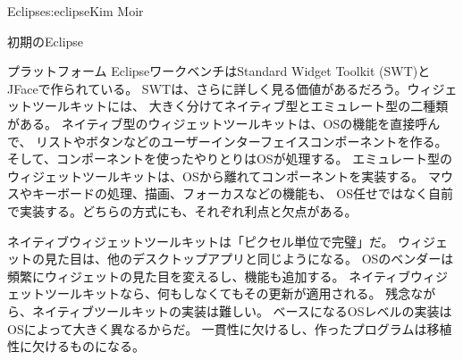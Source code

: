 \begin{aosachapter}{Eclipse}{s:eclipse}{Kim Moir}
\begin{aosasect1}{初期のEclipse}
\begin{aosasect2}{プラットフォーム}
EclipseワークベンチはStandard Widget Toolkit (SWT)とJFaceで作られている。
SWTは、さらに詳しく見る価値があるだろう。ウィジェットツールキットには、
大きく分けてネイティブ型とエミュレート型の二種類がある。
ネイティブ型のウィジェットツールキットは、OSの機能を直接呼んで、
リストやボタンなどのユーザーインターフェイスコンポーネントを作る。
そして、コンポーネントを使ったやりとりはOSが処理する。
エミュレート型のウィジェットツールキットは、OSから離れてコンポーネントを実装する。
マウスやキーボードの処理、描画、フォーカスなどの機能も、
OS任せではなく自前で実装する。どちらの方式にも、それぞれ利点と欠点がある。

ネイティブウィジェットツールキットは「ピクセル単位で完璧」だ。
ウィジェットの見た目は、他のデスクトップアプリと同じようになる。
OSのベンダーは頻繁にウィジェットの見た目を変えるし、機能も追加する。
ネイティブウィジェットツールキットなら、何もしなくてもその更新が適用される。
残念ながら、ネイティブツールキットの実装は難しい。
ベースになるOSレベルの実装はOSによって大きく異なるからだ。
一貫性に欠けるし、作ったプログラムは移植性に欠けるものになる。


\end{aosasect2}
\end{aosasect1}
\end{aosachapter}
